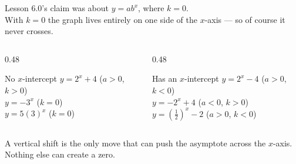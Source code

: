 \documentclass[aspectratio=169, 11pt]{beamer}
\begin{document}
\begin{frame}[t, plain]
  \begin{center}
    Lesson 6.0's claim was about $y=ab^{x}$, where $k=0$. \\[4pt]
    With $k=0$ the graph lives entirely on one side of the $x$-axis --- so of course it never crosses.
  \end{center}
  \vspace{8pt}
  \begin{columns}[T]
    \begin{column}{0.48\textwidth}
      \begin{block}{No $x$-intercept}
        $y=2^{x}+4$ \quad ($a>0$, $k>0$) \\[3pt]
        $y=-3^{x}$ \quad ($k=0$) \\[3pt]
        $y=5(3)^{x}$ \quad ($k=0$)
      \end{block}
    \end{column}
    \begin{column}{0.48\textwidth}
      \begin{block}{Has an $x$-intercept}
        $y=2^{x}-4$ \quad ($a>0$, $k<0$) \\[3pt]
        $y=-2^{x}+4$ \quad ($a<0$, $k>0$) \\[3pt]
        $y=\left(\frac12\right)^{x}-2$ \quad ($a>0$, $k<0$)
      \end{block}
    \end{column}
  \end{columns}
  \vspace{8pt}
  \begin{center}
    {\footnotesize A vertical shift is the only move that can push the asymptote across the $x$-axis.
    Nothing else can create a zero.}
  \end{center}
\end{frame}
\end{document}

